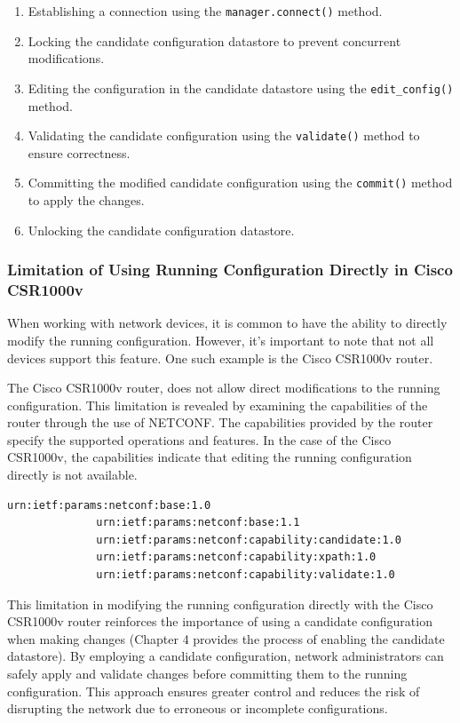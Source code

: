 \begin{enumerate}
  \item Establishing a connection using the \texttt{manager.connect()} method.
  \item Locking the candidate configuration datastore to prevent concurrent modifications.
  \item Editing the configuration in the candidate datastore using the \texttt{edit\_config()} method.
  \item Validating the candidate configuration using the \texttt{validate()} method to ensure correctness.
  \item Committing the modified candidate configuration using the \texttt{commit()} method to apply the changes.
  \item Unlocking the candidate configuration datastore.
\end{enumerate}

\subsubsection{Limitation of Using Running Configuration Directly in Cisco CSR1000v}

When working with network devices, it is common to have the ability to directly modify the running configuration. However, it's important to note that not all devices support this feature. One such example is the Cisco CSR1000v router.

The Cisco CSR1000v router, does not allow direct modifications to the running configuration. This limitation is revealed by examining the capabilities of the router through the use of NETCONF. The capabilities provided by the router specify the supported operations and features. In the case of the Cisco CSR1000v, the capabilities indicate that editing the running configuration directly is not available.

\begin{lstlisting}[style=pythonStyle, caption={Router's capabilities.}, backgroundcolor=\color{codebackground}]
              urn:ietf:params:netconf:base:1.0
              urn:ietf:params:netconf:base:1.1
              urn:ietf:params:netconf:capability:candidate:1.0
              urn:ietf:params:netconf:capability:xpath:1.0
              urn:ietf:params:netconf:capability:validate:1.0
\end{lstlisting}

This limitation in modifying the running configuration directly with the Cisco CSR1000v router reinforces the importance of using a candidate configuration when making changes (Chapter 4 provides the process of enabling the candidate datastore). By employing a candidate configuration, network administrators can safely apply and validate changes before committing them to the running configuration. This approach ensures greater control and reduces the risk of disrupting the network due to erroneous or incomplete configurations.

